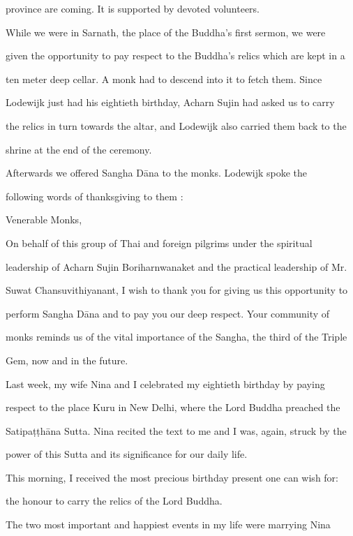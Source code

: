 province are coming. It is supported by devoted volunteers. 

   While we were in  Sarnath, the place of the Buddha’s first sermon, we were  

given the opportunity to pay respect to the Buddha’s relics which are kept in a  

ten  meter  deep  cellar. A  monk  had  to  descend  into  it  to  fetch  them.  Since  

Lodewijk just  had his  eightieth birthday, Acharn  Sujin had  asked us to  carry  

the relics in turn towards the altar, and Lodewijk also carried them back to the  

shrine at the end of the ceremony. 

   Afterwards   we   offered   Sangha   Dāna   to   the   monks.   Lodewijk   spoke   the  

following words of thanksgiving to them : 



      Venerable Monks, 



      On behalf of this group of Thai and foreign pilgrims under the spiritual  

      leadership of Acharn Sujin Boriharnwanaket and the practical leadership of Mr.  

      Suwat Chansuvithiyanant, I wish to thank you for giving us this opportunity to  

      perform Sangha Dāna and to pay you our deep respect. Your community of  

      monks reminds us of the vital importance of the Sangha, the third of the Triple  

      Gem, now and in the future. 

         Last week, my wife Nina and I celebrated my eightieth birthday by paying  

      respect to the place Kuru in New Delhi, where the Lord Buddha preached the  

      Satipaṭṭhāna Sutta. Nina recited the text to me and I was, again, struck by the  

      power of this Sutta and its significance for our daily life. 

         This morning, I received the most precious birthday present one can wish for:  

      the honour to carry the relics of the Lord Buddha. 

         The two most important and happiest events in my life were marrying Nina  

